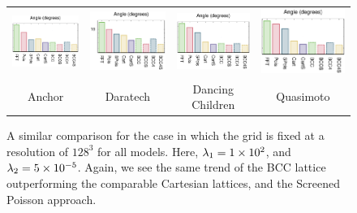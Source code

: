 \begin{figure}
\begin{tabular}{c c c c}
	\includegraphics[width=0.23\linewidth]{figures/anchor/_angle.eps} &
	\includegraphics[width=0.23\linewidth]{figures/daratech/_angle.eps} &
	\includegraphics[width=0.23\linewidth]{figures/dc/_angle.eps} &
	\includegraphics[width=0.23\linewidth]{figures/quasimoto/_angle.eps} \\
	Anchor & Daratech & Dancing Children & Quasimoto 
	\end{tabular}
	\caption{A similar comparison for the case in which the grid is fixed at a resolution of $128^3$ for all models. Here, $\lambda_1=1\times 10^{2}$, and $\lambda_2=5\times 10^{-5}$. Again, we see the same trend of the BCC lattice outperforming the comparable Cartesian lattices, and the Screened Poisson approach.}
	\label{fig:t2}
\end{figure}

